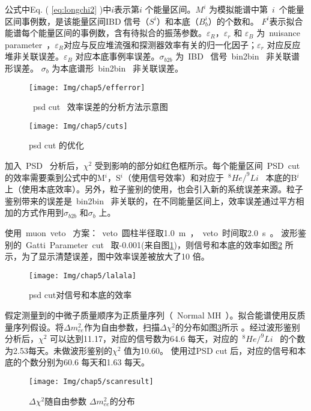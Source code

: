 公式中Eq. ( \ref{eq:longchi2} )中$i$表示第$i$ 个能量区间。$M^{i}$ 为模拟能谱中第~$i$~个能量区间事例数，是该能量区间IBD 信号（$S^i$）和本底（$B^i_b$）的个数和。 $F^i$表示拟合能谱每个能量区间的事例数，含有待拟合的振荡参数。$\varepsilon_R$，$\varepsilon_{r}$  和 $\varepsilon_B$ 为~nuisance parameter~，$\varepsilon_R$对应与反应堆流强和探测器效率有关的归一化因子；$\varepsilon_{r}$ 对应反应堆非关联误差。$\varepsilon_B$ 对应本底事例率误差。$\sigma_{b2b}$ 为~IBD~ 信号~bin2bin~ 非关联谱形误差。 $\sigma_{b}$ 为本底谱形~bin2bin~ 非关联误差。
\begin{figure}[!htb]
\begin{minipage}[t]{0.40\linewidth}
    \centering
    \texttt{[image: Img/chap5/efferror]}
    \caption{~psd cut~ 效率误差的分析方法示意图}
    \label{fig:efferror}
\end{minipage}
\quad\quad
\begin{minipage}[t]{0.40\linewidth}
    \centering
    \texttt{[image: Img/chap5/cuts]}
    \caption{psd cut 的优化}
    \label{fig:p518}
\end{minipage}
\end{figure}
加入~PSD~ 分析后，$\chi^2$ 受到影响的部分如红色框所示。每个能量区间~PSD~cut~ 的效率需要乘到公式中的M$^i$，S$^i$（使用信号效率）和对应于~$^{8}He/^{9}Li$~ 本底的B$^i$上（使用本底效率）。另外，粒子鉴别的使用，也会引入新的系统误差来源。粒子鉴别带来的误差是~bin2bin~ 非关联的，在不同能量区间上，效率误差通过平方相加的方式作用到$\sigma_{b2b}$ 和$\sigma_b$ 上。

使用~muon~veto~ 方案：~veto~圆柱半径取1.0~m~，~veto~时间取2.0~s~。 波形鉴别的~Gatti~Parameter~cut~ 取-0.001(来自图\ref{fig:p518})，则信号和本底的效率如图\ref{fig:p516} 所示，为了显示清楚误差，图中效率误差被放大了10 倍。


\begin{figure}[!htb]
  \centering
   \texttt{[image: Img/chap5/lalala]}
    \caption{psd cut对信号和本底的效率}
  \label{fig:p516}
\end{figure}
假定测量到的中微子质量顺序为正质量序列（~Normal MH~）。拟合能谱使用反质量序列假设。将$\Delta m^2_{ee}$作为自由参数，扫描$\Delta \chi^2$的分布如图\ref{fig:chiscan}所示 。经过波形鉴别分析后，$\chi^2$ 可以达到11.17，对应的信号数为64.6 每天，对应的~$^{8}He/^{9}Li$~ 的个数为2.53每天。未做波形鉴别的$\chi^2$ 值为10.60。 使用过PSD cut 后，对应的信号和本底的个数分别为60.6 每天和1.63 每天。
\begin{figure}[!htb]
  \centering
   \texttt{[image: Img/chap5/scanresult]}
    \caption{$\Delta \chi^2$随自由参数 $\Delta m^2_{ee}$的分布}
  \label{fig:chiscan}
\end{figure}
